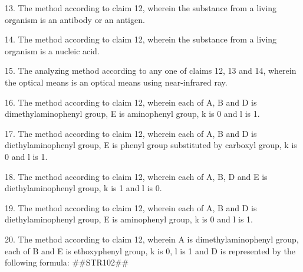 \documentclass[11pt,a4paper]{article}
\begin{document}
13. The method according to claim 12, wherein the substance from a living organism is an antibody or an antigen.

14. The method according to claim 12, wherein the substance from a living organism is a nucleic acid.

15. The analyzing method according to any one of claims 12, 13 and 14, wherein the optical means is an optical means using near-infrared ray.

16. The method according to claim 12, wherein each of A, B and D is dimethylaminophenyl group, E is aminophenyl group, k is 0 and l is 1.

17. The method according to claim 12, wherein each of A, B and D is diethylaminophenyl group, E is phenyl group substituted by carboxyl group, k is 0 and l is 1.

18. The method according to claim 12, wherein each of A, B, D and E is diethylaminophenyl group, k is 1 and l is 0.

19. The method according to claim 12, wherein each of A, B and D is diethylaminophenyl group, E is aminophenyl group, k is 0 and l is 1.

20. The method according to claim 12, wherein A is dimethylaminophenyl group, each of B and E is ethoxyphenyl group, k is 0, l is 1 and D is represented by the following formula: \#\#STR102\#\#
\end{document}
